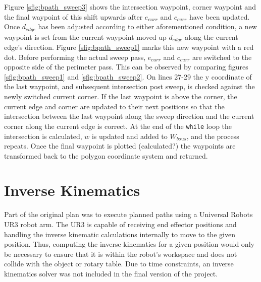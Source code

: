 Figure \ref{sfig:bpath_sweep3} shows the intersection waypoint, corner waypoint and the final waypoint of this shift upwards after $e_{curr}$ and $c_{curr}$ have been updated.
Once $d_{edge}$ has been adjusted according to either aforementioned condition, a new waypoint is set from the current waypoint moved up $d_{edge}$ along the current edge's direction.
Figure \ref{sfig:bpath_sweep1} marks this new waypoint with a red dot.
Before performing the actual sweep pass, $e_{curr}$ and $c_{curr}$ are switched to the opposite side of the perimeter pass.
This can be observed by comparing figures \ref{sfig:bpath_sweep1} and \ref{sfig:bpath_sweep2}.
On lines 27-29 the y coordinate of the last waypoint, and subsequent intersection post sweep, is checked against the newly switched current corner.
If the last waypoint is above the corner, the current edge and corner are updated to their next positions so that the intersection between the last waypoint along the sweep direction and the current corner along the current edge is correct.
At the end of the \verb|while| loop the intersection is calculated, $w$ is updated and added to $W_{bous}$, and the process repeats.
Once the final waypoint is plotted (calculated?) the waypoints are transformed back to the polygon coordinate system and returned.

\section{Inverse Kinematics}
Part of the original plan was to execute planned paths using a Universal Robots UR3 robot arm.
The UR3 is capable of receiving end effector positions and handling the inverse kinematic calculations internally to move to the given position.
Thus, computing the inverse kinematics for a given position would only be necessary to ensure that it is within the robot's workspace and does not collide with the object or rotary table.
Due to time constraints, an inverse kinematics solver was not included in the final version of the project.


